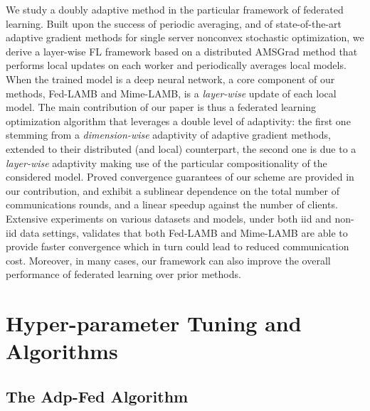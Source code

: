 \documentclass[nohyperref]{article}
\theoremstyle{plain}
\theoremstyle{definition}
\theoremstyle{remark}
\begin{document}
We study a doubly adaptive method in the particular framework of federated learning.
Built upon the success of periodic averaging, and of state-of-the-art adaptive gradient methods for single server nonconvex stochastic optimization, we derive a layer-wise FL framework based on a distributed AMSGrad method that performs local updates on each worker and periodically averages local models. 
When the trained model is a deep neural network, a core component of our methods, Fed-LAMB and Mime-LAMB, is a \emph{layer-wise} update of each local model.
The main contribution of our paper is thus a federated learning optimization algorithm that leverages a double level of adaptivity: the first one stemming from a \emph{dimension-wise} adaptivity of adaptive gradient methods, extended to their distributed (and local) counterpart, the second one is due to a  \emph{layer-wise} adaptivity making use of the particular compositionality of the considered model.
Proved convergence guarantees of our scheme are provided in our contribution, and exhibit a sublinear dependence on the total number of communications rounds, and a linear speedup against the number of clients. Extensive experiments on various datasets and models, under both iid and non-iid data settings, validates that both Fed-LAMB and Mime-LAMB are able to provide faster convergence  which in turn could lead to reduced communication cost. Moreover, in many cases, our framework can also improve the overall performance of federated learning over prior methods.




\clearpage
%






\clearpage


\appendix 
\onecolumn

 
 
 \section{Hyper-parameter Tuning and Algorithms} \label{app:experiment}


\subsection{The Adp-Fed Algorithm~\citep{reddi2020adaptive}}
\end{document}
